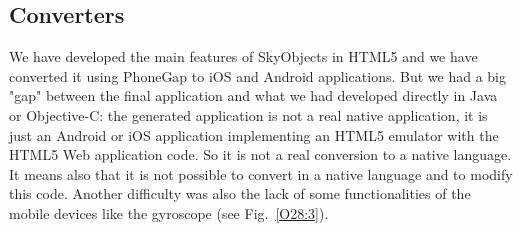 \subsection{Converters}
We have developed the main features of SkyObjects in HTML5 and we have converted it using PhoneGap to iOS and Android applications. But we had a big "gap" between the final application and what we had developed directly in Java or Objective-C: the generated application is not a real native application, it is just an Android or iOS application implementing an HTML5 emulator with the HTML5 Web application code. So it is not a real conversion to a native language. It means also that it is not possible to convert in a native language and to modify this code. Another difficulty was also the lack of some functionalities of the mobile devices like the gyroscope  (see Fig.~\ref{O28:3}).

